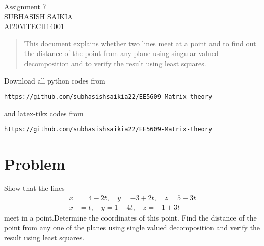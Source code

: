 \documentclass[journal,12pt,twocolumn]{IEEEtran}
\numberwithin{equation}{subsection}
\begin{document}
\begin{center}
\huge Assignment 7\\
\large SUBHASISH SAIKIA\\
\large AI20MTECH14001\\
\end{center}
\vspace{0.5cm}
\begin{abstract}
This document explains whether two lines meet at a point and to find out the distance of the point from any plane using singular valued decomposition and to verify the result using least squares.
\end{abstract}
\vspace{0.5cm}
Download all python codes from 
\begin{lstlisting}
https://github.com/subhasishsaikia22/EE5609-Matrix-theory
\end{lstlisting}
%
and latex-tikz codes from 
\begin{lstlisting}
https://github.com/subhasishsaikia22/EE5609-Matrix-theory
\end{lstlisting}
%
\vspace{0.5cm}
\section{Problem}
Show that the lines
\begin{align}
x&=4-2t,\quad y=-3+2t,\quad z=5-3t\\
x&=t,\quad y=1-4t,\quad z=-1+3t
\end{align}
meet in a point.\quad Determine the coordinates of this point.
Find the distance of the point from any one of the planes using single valued decomposition and verify the result using least squares.
\end{document}
